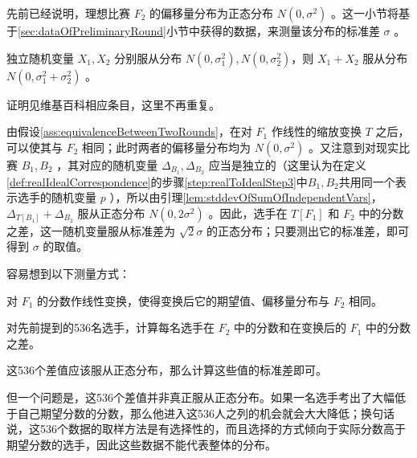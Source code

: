             先前已经说明，理想比赛 $F_2$ 的偏移量分布为正态分布 $N(0,\sigma^2)$ 。这一小节将基于\ref{sec:dataOfPreliminaryRound}小节中获得的数据，来测量该分布的标准差 $\sigma$ 。

            \vspace{1.5ex}

            \begin{lemma}
                独立随机变量 $X_1,X_2$ 分别服从分布 $N(0,\sigma_1^2),N(0,\sigma_2^2)$，则 $X_1+X_2$ 服从分布 $N(0,\sigma_1^2+\sigma_2^2)$ 。

                \label{lem:stddevOfSumOfIndependentVars}
            \end{lemma}

            证明见维基百科相应条目\cite{wiki_sumOfNormVars}，这里不再重复。

            由假设\ref{ass:equivalenceBetweenTwoRounds}，在对 $F_1$ 作线性的缩放变换 $T$ 之后，可以使其与 $F_2$ 相同；此时两者的偏移量分布均为 $N(0,\sigma^2)$ 。又注意到对现实比赛 $B_1,B_2$ ，其对应的随机变量 $\Delta_{B_1},\Delta_{B_2}$ 应当是独立的（这里认为在定义\ref{def:realIdealCorrespondence}的步骤\ref{step:realToIdealStep3}中$B_1,B_2$共用同一个表示选手的随机变量 $p$ ），所以由引理\ref{lem:stddevOfSumOfIndependentVars}，$\Delta_{T\left[B_1\right]}+\Delta_{B_2}$ 服从正态分布 $N(0,2\sigma^2)$ 。因此，选手在 $T\left[F_1\right]$ 和 $F_2$ 中的分数之差，这一随机变量服从标准差为 $\sqrt{2}\sigma$ 的正态分布；只要测出它的标准差，即可得到 $\sigma$ 的取值。

            \vspace{1.5ex}

            容易想到以下测量方式：
            \begin{asparaenum}[\bfseries{步骤} 1.]
                \item 对 $F_1$ 的分数作线性变换，使得变换后它的期望值、偏移量分布与 $F_2$ 相同。
                \item 对先前提到的536名选手，计算每名选手在 $F_2$ 中的分数和在变换后的 $F_1$ 中的分数之差。
                \item 这536个差值应该服从正态分布，那么计算这些值的标准差即可。
            \end{asparaenum}

            但一个问题是，这536个差值并非真正服从正态分布。如果一名选手考出了大幅低于自己期望分数的分数，那么他进入这536人之列的机会就会大大降低；换句话说，这536个数据的取样方法是有选择性的，而且选择的方式倾向于实际分数高于期望分数的选手，因此这些数据不能代表整体的分布。

